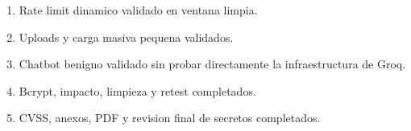 \begin{enumerate}
\def\labelenumi{\arabic{enumi}.}
\tightlist
\item
  Rate limit dinamico validado en ventana limpia.
\item
  Uploads y carga masiva pequena validados.
\item
  Chatbot benigno validado sin probar directamente la infraestructura de Groq.
\item
  Bcrypt, impacto, limpieza y retest completados.
\item
  CVSS, anexos, PDF y revision final de secretos completados.
\end{enumerate}

